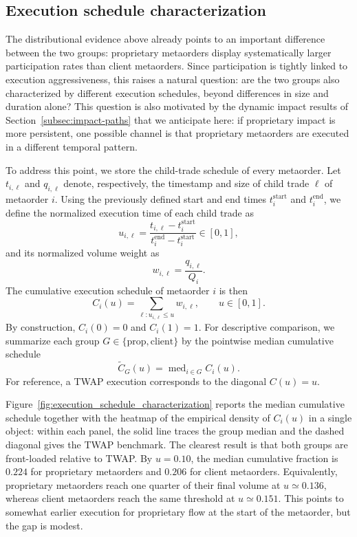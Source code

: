 \documentclass[11pt]{article}
\begin{document}
\subsection{Execution schedule characterization}
\label{subsec:execution_schedule}
The distributional evidence above already points to an important difference
between the two groups: proprietary metaorders display systematically larger
participation rates than client metaorders. Since participation is tightly linked
to execution aggressiveness, this raises a natural question: are the two groups
also characterized by different execution schedules, beyond differences in
size and duration alone? This question is also motivated by the dynamic impact
results of Section~\ref{subsec:impact-paths} that we anticipate here: if proprietary 
impact is more persistent, one possible channel is that proprietary metaorders are 
executed in a different temporal pattern.

To address this point, we store the child-trade schedule of every metaorder.
Let $t_{i,\ell}$ and $q_{i,\ell}$ denote, respectively, the timestamp and size
of child trade $\ell$ of metaorder $i$. Using the previously defined start and
end times $t_i^{\text{start}}$ and $t_i^{\text{end}}$, we define the normalized execution time
of each child trade as
\begin{equation}
  u_{i,\ell} = \frac{t_{i,\ell} - t_i^{\text{start}}}
                    {t_i^{\text{end}} - t_i^{\text{start}}} \in [0,1],
\end{equation}
and its normalized volume weight as
\begin{equation}
  w_{i,\ell} = \frac{q_{i,\ell}}{Q_i}.
\end{equation}
The cumulative execution schedule of metaorder $i$ is then
\begin{equation}
  C_i(u) = \sum_{\ell : u_{i,\ell} \le u} w_{i,\ell},
  \qquad u \in [0,1].
\end{equation}
By construction, $C_i(0)=0$ and $C_i(1)=1$. For descriptive comparison, we
summarize each group $G \in \{\mathrm{prop},\mathrm{client}\}$ by the
pointwise median cumulative schedule
\begin{equation}
  \widetilde C_G(u) = \operatorname{med}_{i \in G} C_i(u).
\end{equation}
For reference, a TWAP execution corresponds to the diagonal $C(u)=u$.

Figure~\ref{fig:execution_schedule_characterization} reports the median
cumulative schedule together with the heatmap of the empirical density of
$C_i(u)$ in a single object: within each panel, the solid line traces the group
median and the dashed diagonal gives the TWAP benchmark. The clearest result is
that both groups are front-loaded relative to TWAP. By $u=0.10$, the median
cumulative fraction is $0.224$ for proprietary metaorders and $0.206$ for
client metaorders. Equivalently, proprietary metaorders reach one quarter of
their final volume at $u \simeq 0.136$, whereas client metaorders reach the
same threshold at $u \simeq 0.151$. This points to somewhat earlier execution
for proprietary flow at the start of the metaorder, but the gap is modest.
\end{document}
